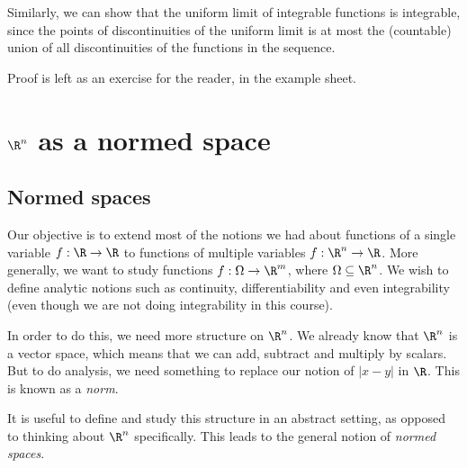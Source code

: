 \documentclass[a4paper]{article}
\begin{document}
Similarly, we can show that the uniform limit of integrable functions is integrable, since the points of discontinuities of the uniform limit is at most the (countable) union of all discontinuities of the functions in the sequence.

Proof is left as an exercise for the reader, in the example sheet.

\section{\texorpdfstring{$\R^n$}{Rn} as a normed space}
\subsection{Normed spaces}
Our objective is to extend most of the notions we had about functions of a single variable $f: \R \to \R$ to functions of multiple variables $f: \R^n \to \R$. More generally, we want to study functions $f: \Omega \to \R^m$, where $\Omega \subseteq \R^n$. We wish to define analytic notions such as continuity, differentiability and even integrability (even though we are not doing integrability in this course).

In order to do this, we need more structure on $\R^n$. We already know that $\R^n$ is a vector space, which means that we can add, subtract and multiply by scalars. But to do analysis, we need something to replace our notion of $|x - y|$ in $\R$. This is known as a \emph{norm}.

It is useful to define and study this structure in an abstract setting, as opposed to thinking about $\R^n$ specifically. This leads to the general notion of \emph{normed spaces}.
\end{document}
